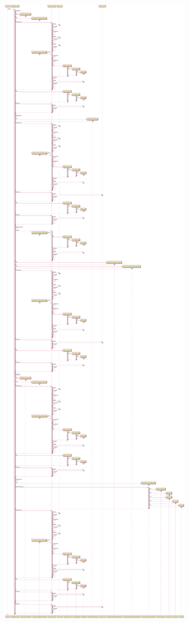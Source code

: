 \includegraphics[width=\textwidth,height=\textheight,keepaspectratio]{Schemas/HomePageServlet_doGet.svg.pdf}

